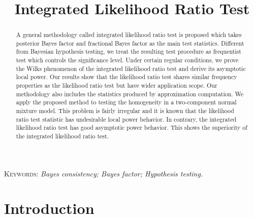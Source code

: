 \documentclass[11pt]{article}
\title{Integrated Likelihood Ratio Test}
\theoremstyle{plain}
\theoremstyle{definition}
\theoremstyle{remark}
\begin{document}
\maketitle
\begin{abstract}
    A general methodology called integrated likelihood ratio test is proposed which takes posterior Bayes factor and fractional Bayes factor as the main test statistics.
    Different from Bayesian hypothesis testing, we treat the resulting test procedure as frequentist test which controls the significance level.
    Under certain regular conditions, we prove the Wilks phenomenon of the integrated likelihood ratio test and derive its asymptotic local power.
    Our results show that the likelihood ratio test shares similar frequency properties as the likelihood ratio test{\color{red} but have wider application scope}.
    Our methodology also includes the statistics produced by approximation computation.
    We apply the proposed method to testing the homogeneity in a two-component normal mixture model.
    This problem is fairly irregular and it is known that the likelihood ratio test statistic has undesirable local power behavior.
    In contrary, the integrated likelihood ratio test has good asymptotic power behavior.
    This shows the superiority of the integrated likelihood ratio test.
\end{abstract}
{\small \textsc{Keywords:} {\em
    Bayes consistency;
   Bayes factor;
   Hypothesis testing.
}}



\section{Introduction}




\end{document}
